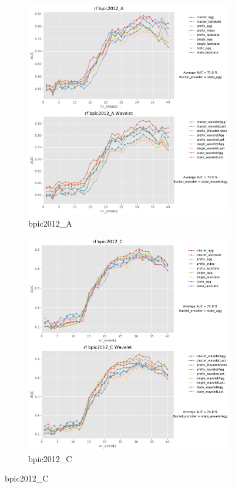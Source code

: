 \documentclass[twoside,11pt]{Latex/Classes/PhDthesisPSnPDF}
\begin{document}
\begin{figure}[!htbp] %
	
	\begin{subfigure}{0.48\textwidth}
		\includegraphics[width=\linewidth]{images/wavelet/graphs2rf/bpic2012_A.pdf}
		\caption{bpic2012\_A} 
	\end{subfigure}\hspace*{\fill}
	\begin{subfigure}{0.48\textwidth}
		\includegraphics[width=\linewidth]{images/wavelet/graphs2rf/bpic2012_C.pdf}
		\caption{bpic2012\_C}
	\end{subfigure}
	

\end{figure}
\end{document}

